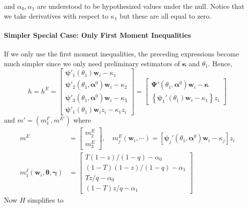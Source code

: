 \documentclass[12pt]{article}
\begin{document}
and $\alpha_0,\alpha_1$ are understood to be hypothesized values under the null.
Notice that we take derivatives with respect to $\kappa_1$ but these are all equal to zero.

\paragraph{Simpler Special Case: Only First Moment Inequalities}
If we only use the first moment inequalities, the preceding expressions become much simpler since we only need preliminary estimators of $\boldsymbol{\kappa}$ and $\theta_1$.
Hence,
\[
  h = h^E  =  \left[
 \begin{array}{l}
   \boldsymbol{\psi}'_1(\theta_1)\mathbf{w}_i - \kappa_1\\
   \boldsymbol{\psi}'_2(\theta_1,\boldsymbol{\alpha}^0)\mathbf{w}_i - \kappa_2\\
   \boldsymbol{\psi}'_3(\theta_1,\boldsymbol{\alpha}^0)\mathbf{w}_i - \kappa_3\\ 
   \boldsymbol{\psi}'_1(\theta_1)\mathbf{w}_i z_i - \kappa_1 z_i
 \end{array}
 \right] = \left[
 \begin{array}{l}
   \boldsymbol{\Psi}'(\theta_1, \boldsymbol{\alpha}^0) \mathbf{w}_i - \boldsymbol{\kappa}\\
   \left\{\boldsymbol{\psi}_1'(\theta_1)\mathbf{w}_i - \kappa_1\right\}z_i
 \end{array}
 \right]
\]
and $m' = (m^{I'}_1, m^{E'})$ where
\begin{align*}
m^E &= \left[
  \begin{array}{cc}
    m_2^E \\ m_3^E 
  \end{array}
\right], \quad m_j^E(\mathbf{w}_i, \cdots) = \left[ \boldsymbol{\psi}_j'(\theta_1, \boldsymbol{\alpha}^0) \mathbf{w}_i - \kappa_j \right]z_i  \\
m_1^I(\mathbf{w}_i, \boldsymbol{\theta}, \boldsymbol{\gamma}) &=
  \left[
  \begin{array}{r}
  T(1 - z)/(1 - q) - \alpha_0 \\
  (1 - T)(1 - z)/(1 - q) - \alpha_1  \\
  Tz/q - \alpha_0 \\
  (1 - T)z/q - \alpha_1  
  \end{array}
\right]
\end{align*}
Now $H$ simplifies to
\end{document}
